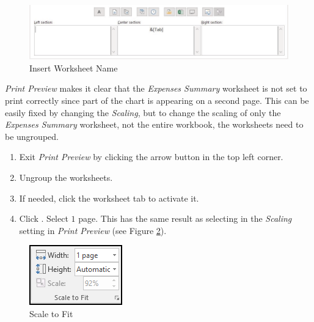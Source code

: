 \begin{figure}[H]
	\centering
	\includegraphics[width=\maxwidth{.95\linewidth}]{gfx/ch06_fig15}
	\caption{Insert Worksheet Name}
	\label{06:fig15}
\end{figure}

\textit{Print Preview} makes it clear that the \textit{Expenses Summary} worksheet is not set to print correctly since part of the chart is appearing on a second page. This can be easily fixed by changing the \textit{Scaling}, but to change the scaling of only the \textit{Expenses Summary} worksheet, not the entire workbook, the worksheets need to be ungrouped.

\begin{enumerate}
	\item Exit \textit{Print Preview} by clicking the arrow button in the top left corner.
	\item Ungroup the worksheets.
	\item If needed, click the  worksheet tab to activate it.
	\item Click . Select $ 1 $ page. This has the same result as selecting  in the \textit{Scaling} setting in \textit{Print Preview} (see Figure \ref{06:fig16}).
\end{enumerate}

\begin{figure}[H]
	\centering
	\includegraphics[width=\maxwidth{.35\linewidth}]{gfx/ch06_fig16}
	\caption{Scale to Fit}
	\label{06:fig16}
\end{figure}

